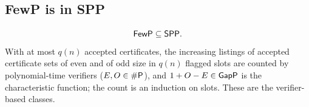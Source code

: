 \begin{result}
\subsection{FewP is in SPP}
\[\mathsf{FewP}\subseteq\mathsf{SPP}.\]
With at most $q(n)$ accepted certificates, the increasing listings of accepted certificate sets of
even and of odd size in $q(n)$ flagged slots are counted by polynomial-time verifiers
($E,O\in\#\mathsf{P}$), and $1+O-E\in\mathsf{GapP}$ is the characteristic function; the count is an
induction on slots. These are the verifier-based classes.
\citep{KoeblerSchoeningTodaToran1992,FennerFortnowKurtz1994}
\end{result}


